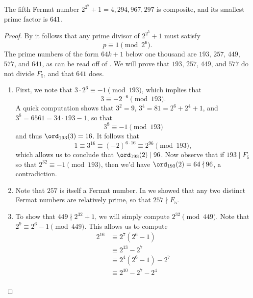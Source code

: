 \begin{corollary}\label{corollary:F5}
  The fifth Fermat number $2^{2^5}+1=4,294,967,297$ is composite, and its smallest prime factor is $641$.
\end{corollary}

\begin{proof}
  By  it follows that any prime divisor of $2^{2^5}+1$ must satisfy
  \begin{equation*}
    p\equiv 1\pmod{2^6}.
  \end{equation*}
  The prime numbers of the form $64k+1$ below one thousand are $193$, $257$, $449$, $577$, and $641$, as can be read off of . We will prove that $193$, $257$, $449$, and $577$ do not divide $F_5$, and that $641$ does.
  \begin{enumerate}
  \item First, we note that $3\cdot 2^6\equiv -1\pmod{193}$, which implies that
    \begin{equation*}
      3\equiv -2^{-6}\pmod{193}.
    \end{equation*}
    A quick computation shows that $3^2=9$, $3^4=81=2^6+2^4+1$, and $3^8=6561=34\cdot 193-1$, so that
    \begin{equation*}
      3^8\equiv -1\pmod{193}
    \end{equation*}
    and thus $\ord_{193}(3)=16$. It follows that
    \begin{equation*}
      1\equiv 3^{16}\equiv (-2)^{6\cdot 16}\equiv 2^{96}\pmod{193},
    \end{equation*}
    which allows us to conclude that $\ord_{193}(2)\mid 96$. Now observe that if $193\mid F_5$ so that $2^{32}\equiv -1\pmod{193}$, then we'd have $\ord_{193}(2)=64\nmid 96$, a contradiction.
  \item Note that $257$ is itself a Fermat number. In  we showed that any two distinct Fermat numbers are relatively prime, so that $257\nmid F_5$.
  \item To show that $449\nmid 2^{32}+1$, we will simply compute $2^{32}\pmod{449}$. Note that $2^9\equiv 2^6-1\pmod{449}$. This allows us to compute
    \begin{align*}
      2^{16}
      & \equiv 2^7(2^6-1) \\
      & \equiv 2^{13}-2^7 \\
      & \equiv 2^4(2^6-1)-2^7 \\
      & \equiv 2^{10}-2^7-2^4 \\

\end{align*}
\end{enumerate}
\end{proof}
